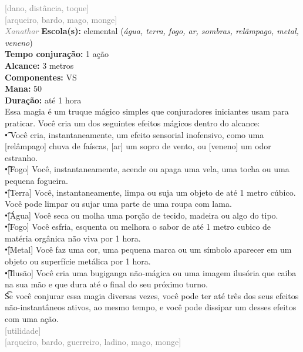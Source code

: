 \documentclass{RPG_Adventure}[2021/10/20]
\begin{document}
{\scriptsize \textcolor{gray}{[dano, distância, toque]\\}}
{\scriptsize \textcolor{gray}{[arqueiro, bardo, mago, monge]\\}}
{\tiny \textcolor{gray}{\textit{Xanathar}}}
{\small \t \textbf{Escola(s):} elemental (\textit{água, terra, fogo, ar, sombras, relâmpago, metal, veneno})\\\t \textbf{Tempo conjuração:} 1 ação\\\t \textbf{Alcance:} 3 metros\\\t \textbf{Componentes:} VS\\\t \textbf{Mana:} 50\\\t \textbf{Duração:} até 1 hora\\}
{\normalsize Essa magia é um truque mágico simples que conjuradores iniciantes usam para praticar. Você cria um dos seguintes efeitos mágicos dentro do alcance:\\\t • Você cria, instantaneamente, um efeito sensorial inofensivo, como uma [relâmpago] chuva de faíscas, [ar] um sopro de vento, ou [veneno] um odor estranho.\\\t •[Fogo] Você, instantaneamente, acende ou apaga uma vela, uma tocha ou uma pequena fogueira.\\\t •[Terra] Você, instantaneamente, limpa ou suja um objeto de até 1 metro cúbico. Você pode limpar ou sujar uma parte de uma roupa com lama.\\\t •[Água] Você seca ou molha uma porção de tecido, madeira ou algo do tipo.\\\t •[Fogo] Você esfria, esquenta ou melhora o sabor de até 1 metro cubico de matéria orgânica não viva por 1 hora.\\\t •[Metal] Você faz uma cor, uma pequena marca ou um símbolo aparecer em um objeto ou superfície metálica por 1 hora.\\\t •[Ilusão] Você cria uma bugiganga não-mágica ou uma imagem ilusória que caiba na sua mão e que dura até o final do seu próximo turno.\\\t Se você conjurar essa magia diversas vezes, você pode ter até três dos seus efeitos não-instantâneos ativos, ao mesmo tempo, e você pode dissipar um desses efeitos com uma ação.\\}
{\scriptsize \textcolor{gray}{[utilidade]\\}}
{\scriptsize \textcolor{gray}{[arqueiro, bardo, guerreiro, ladino, mago, monge]\\}}
\end{document}
